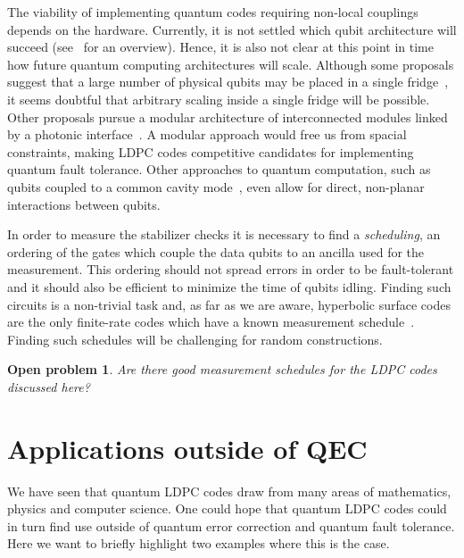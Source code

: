 \documentclass[amsmath, amssymb, floatfix, reprint, twocolumn, notitlepage, 10pt]{revtex4-1}
\newtheorem*{oproblem}{Open problem}
\begin{document}
The viability of implementing quantum codes requiring non-local couplings depends on the hardware.
Currently, it is not settled which qubit architecture will succeed (see~\cite{qubitzoo} for an overview).
Hence, it is also not clear at this point in time how future quantum computing architectures will scale.
Although some proposals suggest that a large number of physical qubits may be placed in a single fridge~\cite{fowler2012surface},  it seems doubtful that arbitrary scaling inside a single fridge will be possible.
Other proposals pursue a modular architecture of interconnected modules linked by a photonic interface~\cite{monroe2013scaling,nigmatullin2016minimally,nickerson2014freely,rudolph2017optimistic}.
A modular approach would free us from spacial constraints, making LDPC codes competitive candidates for implementing quantum fault tolerance.
Other approaches to quantum computation, such as qubits coupled to a common cavity mode~\cite{PhysRevLett.75.3788,PhysRevA.94.053830}, even allow for direct, non-planar interactions between qubits.

In order to measure the stabilizer checks it is necessary to find a \emph{scheduling}, an ordering of the gates which couple the data qubits to an ancilla used for the measurement.
This ordering should not spread errors in order to be fault-tolerant and it should also be efficient to minimize the time of qubits idling.
Finding such circuits is a non-trivial task and, as far as we are aware, hyperbolic surface codes are the only finite-rate codes which have a known measurement schedule~\cite{conrad2018small,higgott2020subsystem}.
Finding such schedules will be challenging for random constructions.
\begin{oproblem}
Are there good measurement schedules for the LDPC codes discussed here?
\end{oproblem}


\section{Applications outside of QEC}\label{sec:applicationsoutside}
We have seen that quantum LDPC codes draw from many areas of mathematics, physics and computer science.
One could hope that quantum LDPC codes could in turn find use outside of quantum error correction and quantum fault tolerance.
Here we want to briefly highlight two examples where this is the case.
\end{document}
